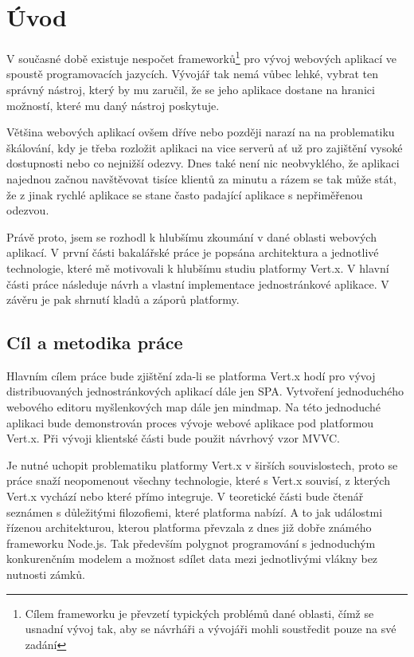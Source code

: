 
\chapter{Úvod}

V současné době existuje nespočet frameworků\footnote{Cílem frameworku je převzetí typických problémů dané oblasti, čímž se usnadní vývoj tak, aby se návrháři a vývojáři mohli soustředit pouze na své zadání} pro vývoj webových aplikací ve spoustě programovacích jazycích. Vývojář tak nemá vůbec lehké, vybrat ten správný nástroj, který by mu zaručil, že se jeho aplikace dostane na hranici možností, které mu daný nástroj poskytuje. 

Většina webových aplikací ovšem dříve nebo později narazí na na problematiku škálování, kdy je třeba rozložit aplikaci na vice serverů ať už pro zajištění vysoké dostupnosti nebo co nejnižší odezvy. Dnes také není nic neobvyklého, že aplikaci najednou začnou navštěvovat tisíce klientů za minutu a rázem se tak může stát, že z jinak rychlé aplikace se stane často padající aplikace s nepřiměřenou odezvou.

Právě proto, jsem se rozhodl k hlubšímu zkoumání v dané oblasti webových aplikací. V první části bakalářské práce je popsána architektura a jednotlivé technologie, které mě motivovali k hlubšímu studiu platformy Vert.x. V hlavní části práce následuje návrh a vlastní implementace jednostránkové aplikace. V závěru je pak shrnutí kladů a záporů platformy. 

\section{Cíl a metodika práce}

Hlavním cílem práce bude zjištění zda-li se  platforma Vert.x hodí pro vývoj distribuovaných jednostránkových aplikací dále jen SPA. Vytvoření jednoduchého webového editoru myšlenkových map dále jen mindmap. %
Na této jednoduché aplikaci bude demonstrován proces vývoje webové aplikace pod platformou Vert.x. Při vývoji klientské části bude použit návrhový vzor MVVC.

Je nutné uchopit problematiku platformy Vert.x v širších souvislostech, proto se práce snaží neopomenout všechny technologie, které s Vert.x souvisí, z kterých Vert.x vychází nebo které přímo integruje. V teoretické části bude čtenář seznámen s důležitými filozofiemi, které platforma nabízí. A to jak událostmi řízenou architekturou, kterou platforma převzala z dnes již dobře známého frameworku Node.js. Tak především polygnot programování s jednoduchým konkurenčním modelem a možnost sdílet data mezi jednotlivými vlákny bez nutnosti zámků.

